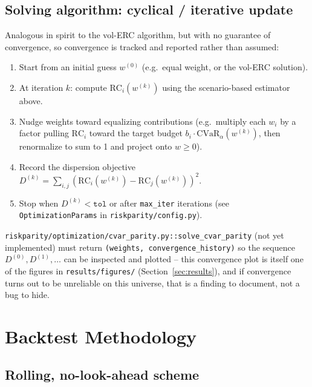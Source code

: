 \documentclass[11pt]{article}
\newcommand{\CVar}{\mathrm{CVaR}}
\begin{document}
\subsection{Solving algorithm: cyclical / iterative update}

Analogous in spirit to the vol-ERC algorithm, but with no guarantee of
convergence, so convergence is tracked and reported rather than assumed:

\begin{enumerate}
    \item Start from an initial guess $w^{(0)}$ (e.g.\ equal weight, or
    the vol-ERC solution).
    \item At iteration $k$: compute $\text{RC}_i(w^{(k)})$ using the
    scenario-based estimator above.
    \item Nudge weights toward equalizing contributions (e.g.\ multiply
    each $w_i$ by a factor pulling $\text{RC}_i$ toward the target budget
    $b_i \cdot \CVar_\alpha(w^{(k)})$, then renormalize to sum to 1 and
    project onto $w \geq 0$).
    \item Record the dispersion objective
    $D^{(k)} = \sum_{i,j}(\text{RC}_i(w^{(k)}) - \text{RC}_j(w^{(k)}))^2$.
    \item Stop when $D^{(k)} < \texttt{tol}$ or after
    \texttt{max\_iter} iterations (see
    \texttt{OptimizationParams} in \texttt{riskparity/config.py}).
\end{enumerate}

\texttt{riskparity/optimization/cvar\_parity.py::solve\_cvar\_parity}
(not yet implemented) must return \texttt{(weights, convergence\_history)}
so the sequence $D^{(0)}, D^{(1)}, \dots$ can be inspected and plotted --
this convergence plot is itself one of the figures in
\texttt{results/figures/} (Section~\ref{sec:results}), and if convergence
turns out to be unreliable on this universe, that is a finding to
document, not a bug to hide.

\section{Backtest Methodology}
\label{sec:backtest}

\subsection{Rolling, no-look-ahead scheme}
\end{document}
